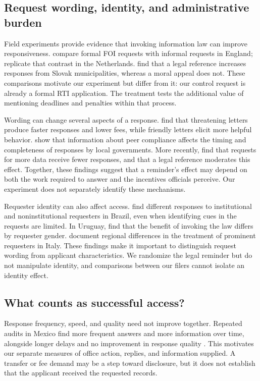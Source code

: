 \documentclass[11pt]{article}
\begin{document}
\subsection{Request wording, identity, and administrative burden}
Field experiments provide evidence that invoking information law can improve responsiveness. \citet{worthy2017} compare formal FOI requests with informal requests in England; \citet{grimmelikhuijsen2019} replicate that contrast in the Netherlands. \citet{spac2018} find that a legal reference increases responses from Slovak municipalities, whereas a moral appeal does not. These comparisons motivate our experiment but differ from it: our control request is already a formal RTI application. The treatment tests the additional value of mentioning deadlines and penalties within that process.

Wording can change several aspects of a response. \citet{cuillier2010} find that threatening letters produce faster responses and lower fees, while friendly letters elicit more helpful behavior. \citet{benaaron2017} show that information about peer compliance affects the timing and completeness of responses by local governments. More recently, \citet{spac2025} find that requests for more data receive fewer responses, and that a legal reference moderates this effect. Together, these findings suggest that a reminder's effect may depend on both the work required to answer and the incentives officials perceive. Our experiment does not separately identify these mechanisms.

Requester identity can also affect access. \citet{michener2020} find different responses to institutional and noninstitutional requesters in Brazil, even when identifying cues in the requests are limited. In Uruguay, \citet{pineiro2018} find that the benefit of invoking the law differs by requester gender. \citet{cicatiello2024} document regional differences in the treatment of prominent requesters in Italy. These findings make it important to distinguish request wording from applicant characteristics. We randomize the legal reminder but do not manipulate identity, and comparisons between our filers cannot isolate an identity effect.

\subsection{What counts as successful access?}
Response frequency, speed, and quality need not improve together. Repeated audits in Mexico find more frequent answers and more information over time, alongside longer delays and no improvement in response quality \citep{lagunes2019}. This motivates our separate measures of office action, replies, and information supplied. A transfer or fee demand may be a step toward disclosure, but it does not establish that the applicant received the requested records.
\end{document}
